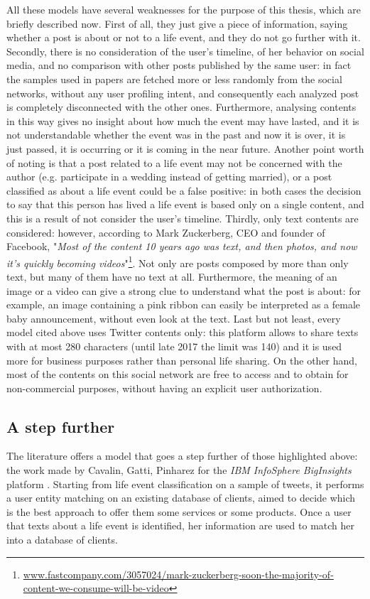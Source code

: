 All these models have several weaknesses for the purpose of this thesis, which are briefly described now. First of all, they just give a piece of information, saying whether a post is about or not to a life event, and they do not go further with it. Secondly, there is no consideration of the user's timeline, of her behavior on social media, and no comparison with other posts published by the same user: in fact the samples used in papers are fetched more or less randomly from the social networks, without any user profiling intent, and consequently each analyzed post is completely disconnected with the other ones. Furthermore, analysing contents in this way gives no insight about how much the event may have lasted, and it is not understandable whether the event was in the past and now it is over, it is just passed, it is occurring or it is coming in the near future. Another point worth of noting is that a post related to a life event may not be concerned with the author (e.g. participate in a wedding instead of getting married), or a post classified as about a life event could be a false positive: in both cases the decision to say that this person has lived a life event is based only on a single content, and this is a result of not consider the user's timeline. Thirdly, only text contents are considered: however, according to Mark Zuckerberg, CEO and founder of Facebook, "\textit{Most of the content 10 years ago was text, and then photos, and now it's quickly becoming videos}"\footnote{\url{www.fastcompany.com/3057024/mark-zuckerberg-soon-the-majority-of-content-we-consume-will-be-video}}. Not only are posts composed by more than only text, but many of them have no text at all. Furthermore, the meaning of an image or a video can give a strong clue to understand what the post is about: for example, an image containing a pink ribbon can easily be interpreted as a female baby announcement, without even look at the text. Last but not least, every model cited above uses Twitter contents only: this platform allows to share texts with at most 280 characters (until late 2017 the limit was 140) and it is used more for business purposes rather than personal life sharing. On the other hand, most of the contents on this social network are free to access and to obtain for non-commercial purposes, without having an explicit user authorization.

\subsection{A step further}
The literature offers a model that goes a step further of those highlighted above: the work made by Cavalin, Gatti, Pinharez for the \emph{IBM InfoSphere BigInsights} platform \cite{cavalin2014towards}. Starting from life event classification on a sample of tweets, it performs a user entity matching on an existing database of clients, aimed to decide which is the best approach to offer them some services or some products. Once a user that texts about a life event is identified, her information are used to match her into a database of clients.


